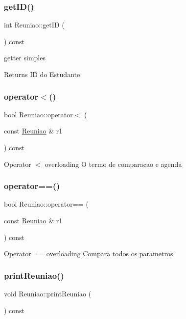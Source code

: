 \subsubsection{\texorpdfstring{get\+I\+D()}{getID()}}
{\footnotesize\ttfamily int Reuniao\+::get\+ID (\begin{DoxyParamCaption}{ }\end{DoxyParamCaption}) const}

getter simples \begin{DoxyReturn}{Returns}
ID do Estudante 
\end{DoxyReturn}
\hypertarget{class_reuniao_a66853a7c1b5d70e529b1b0964f21fc62}{}\label{class_reuniao_a66853a7c1b5d70e529b1b0964f21fc62} 
\subsubsection{\texorpdfstring{operator$<$()}{operator<()}}
{\footnotesize\ttfamily bool Reuniao\+::operator$<$ (\begin{DoxyParamCaption}\item[{const \hyperlink{class_reuniao}{Reuniao} \&}]{r1 }\end{DoxyParamCaption}) const}

Operator $<$ overloading O termo de comparacao e\textquotesingle{} agenda \hypertarget{class_reuniao_a0ee9805621e0e6d0f28fa14a7a623eab}{}\label{class_reuniao_a0ee9805621e0e6d0f28fa14a7a623eab} 
\subsubsection{\texorpdfstring{operator==()}{operator==()}}
{\footnotesize\ttfamily bool Reuniao\+::operator== (\begin{DoxyParamCaption}\item[{const \hyperlink{class_reuniao}{Reuniao} \&}]{r1 }\end{DoxyParamCaption}) const}

Operator == overloading Compara todos os parametros \hypertarget{class_reuniao_a0eb3204ecc596f02362fec03d414f940}{}\label{class_reuniao_a0eb3204ecc596f02362fec03d414f940} 
\subsubsection{\texorpdfstring{print\+Reuniao()}{printReuniao()}}
{\footnotesize\ttfamily void Reuniao\+::print\+Reuniao (\begin{DoxyParamCaption}{ }\end{DoxyParamCaption}) const}


